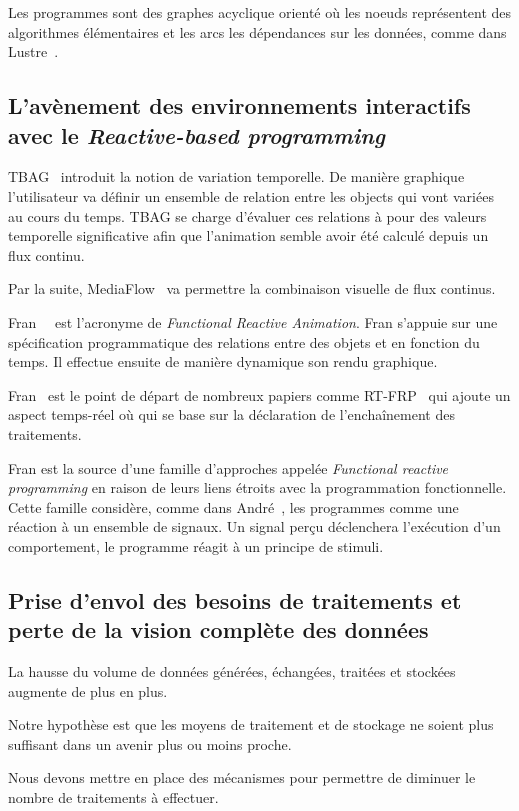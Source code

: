 \documentclass{llncs}
\newcommand{\RP}{\emph{Reactive-based programming} }
\newcommand{\FRP}{\emph{Functional reactive programming} }
\begin{document}
Les programmes sont des graphes acyclique orienté où les noeuds représentent des
algorithmes élémentaires et les arcs les dépendances sur les données, comme dans
Lustre~\cite{Caspi87}.

\subsection{L'avènement des environnements interactifs avec le \RP}
TBAG~\cite{Elliott94} introduit la notion de variation temporelle.
De manière graphique l'utilisateur va définir un ensemble de relation
entre les objects qui vont variées au cours du temps.
TBAG se charge d'évaluer ces relations à pour des valeurs temporelle
significative afin que l'animation semble avoir été calculé depuis
un flux continu.

Par la suite, MediaFlow~\cite{Elliott95} va permettre la combinaison visuelle
de flux continus.

Fran~\cite{Elliott97}~\cite{Elliott98} est l'acronyme de \emph{Functional Reactive Animation}.
Fran s'appuie sur une spécification programmatique des relations entre des objets
et en fonction du temps.
Il effectue ensuite de manière dynamique son rendu graphique.

Fran~\cite{Elliott97} est le point de départ de nombreux papiers comme RT-FRP~\cite{Wan02}
qui ajoute un aspect temps-réel où \cite{Nilsson2002a} qui se base sur la déclaration
de l'enchaînement des traitements.

Fran est la source d'une famille d'approches appelée \FRP en raison de leurs liens
étroits avec la programmation fonctionnelle.
Cette famille considère, comme dans André~\cite{Andre96}, les programmes comme
une réaction à un ensemble de signaux. Un signal perçu déclenchera l'exécution
d'un comportement, le programme réagit à un principe de stimuli.

\subsection{Prise d'envol des besoins de traitements et perte de la vision complète des données}
La hausse du volume de données générées, échangées, traitées et stockées augmente de
plus en plus.

Notre hypothèse est que les moyens de traitement et de stockage ne soient plus
suffisant dans un avenir plus ou moins proche.

Nous devons mettre en place des mécanismes pour permettre de diminuer le nombre
de traitements à effectuer.
\end{document}
